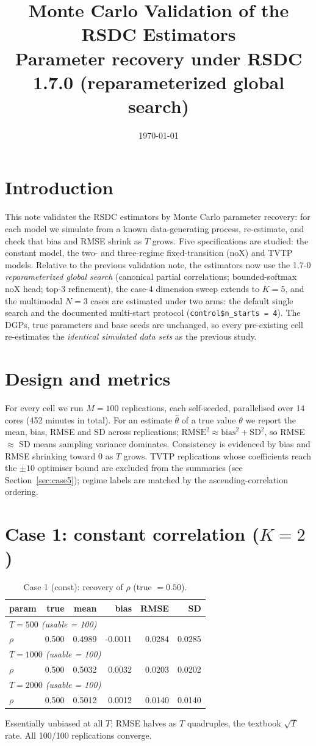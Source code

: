 \documentclass[11pt]{article}
\title{Monte Carlo Validation of the RSDC Estimators\\
\large Parameter recovery under RSDC 1.7.0 (reparameterized global search)
}\date{\today}\author{}
\begin{document}
\maketitle
\section{Introduction}
This note validates the RSDC estimators by Monte Carlo parameter recovery:
for each model we simulate from a known data-generating process,
re-estimate, and check that bias and RMSE shrink as $T$ grows. Five
specifications are studied: the constant model, the two- and three-regime
fixed-transition (noX) and TVTP models. Relative to the previous validation
note, the estimators now use the 1.7-0 \emph{reparameterized global
search} (canonical partial correlations; bounded-softmax noX head; top-3
refinement), the case-4 dimension sweep extends to $K = 5$, and the
multimodal $N = 3$ cases are estimated under two arms: the default single
search and the documented multi-start protocol
(\texttt{control\$n\_starts = 4}). The DGPs, true parameters and base
seeds are unchanged, so every pre-existing cell re-estimates the
\emph{identical simulated data sets} as the previous study.
\section{Design and metrics}
For every cell we run $M = 100$ replications, each self-seeded,
parallelised over 14 cores (452 minutes in total). For an estimate
$\hat\theta$ of a true value $\theta$ we report the mean, bias, RMSE and
SD across replications; $\mathrm{RMSE}^2 \approx \mathrm{bias}^2 +
\mathrm{SD}^2$, so RMSE $\approx$ SD means sampling variance dominates.
Consistency is evidenced by bias and RMSE shrinking toward 0 as $T$ grows.
TVTP replications whose coefficients reach the $\pm 10$ optimiser bound
are excluded from the summaries (see Section~\ref{sec:case5}); regime
labels are matched by the ascending-correlation ordering.
\section{Case 1: constant correlation ($K = 2$)}
\begin{table}[!htbp]\centering\small
\caption{Case 1 (const): recovery of $\rho$ (true $= 0.50$).}\label{tab:c1}
\begin{tabular}{lrrrrr}
\toprule
param & true & mean & bias & RMSE & SD\\
\midrule\multicolumn{6}{l}{\emph{$T = 500$ (usable = 100)}}\\
$\rho$ & 0.500 & 0.4989 & -0.0011 & 0.0284 & 0.0285\\
\midrule\multicolumn{6}{l}{\emph{$T = 1000$ (usable = 100)}}\\
$\rho$ & 0.500 & 0.5032 & 0.0032 & 0.0203 & 0.0202\\
\midrule\multicolumn{6}{l}{\emph{$T = 2000$ (usable = 100)}}\\
$\rho$ & 0.500 & 0.5012 & 0.0012 & 0.0140 & 0.0140\\
\bottomrule
\end{tabular}
\end{table}
Essentially unbiased at all $T$; RMSE halves as $T$ quadruples, the
textbook $\sqrt{T}$ rate. All 100/100 replications converge.
\end{document}
